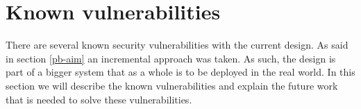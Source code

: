 \chapter{Known vulnerabilities}
\label{problems}
There are several known security vulnerabilities with the current design.
As said in section \ref{pb-aim} an incremental approach was taken.
As such, the design is part of a bigger system that as a whole is to be deployed in the real world.
In this section we will describe the known vulnerabilities
and explain the future work that is needed to solve these vulnerabilities.









